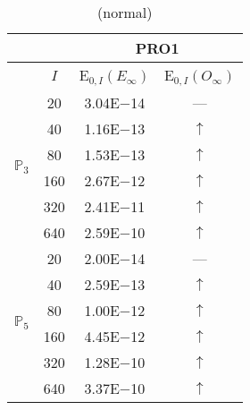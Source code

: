 \begin{table}[H]
\caption{(normal)}
\setlength{\tabcolsep}{5pt}
\centering
\begin{tabular}{@{}l c c c@{}}
\toprule
 &  & \multicolumn{2}{c}{PRO1}\\
\midrule
 & $I$ & E$_{0,I}(E_{\infty})$ & E$_{0,I}(O_{\infty})$\\
\midrule
\multirow{6}{*}{$\mathbb{P}_{3}$}
 & 20 & 3.04E$-$14 & ---\\
 & 40 & 1.16E$-$13 & $\uparrow$\\
 & 80 & 1.53E$-$13 & $\uparrow$\\
 & 160 & 2.67E$-$12 & $\uparrow$\\
 & 320 & 2.41E$-$11 & $\uparrow$\\
 & 640 & 2.59E$-$10 & $\uparrow$\\
\midrule
\multirow{6}{*}{$\mathbb{P}_{5}$}
 & 20 & 2.00E$-$14 & ---\\
 & 40 & 2.59E$-$13 & $\uparrow$\\
 & 80 & 1.00E$-$12 & $\uparrow$\\
 & 160 & 4.45E$-$12 & $\uparrow$\\
 & 320 & 1.28E$-$10 & $\uparrow$\\
 & 640 & 3.37E$-$10 & $\uparrow$\\
\bottomrule
\end{tabular}
\label{Table:PRO:test_01_01_test47_pro1}
\end{table}

